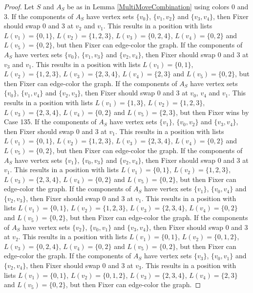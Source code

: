 \documentclass[12pt]{amsart}
\theoremstyle{plain}
\theoremstyle{definition}
\theoremstyle{remark}
\begin{document}
\begin{proof}
Let $S$ and $A_S$ be as in Lemma \ref{MultiMoveCombination} using colors $0$ and $3$. If the components of $A_S$ have vertex sets $\{v_0\}$, $\{v_1, v_2\}$ and $\{v_3, v_4\}$, then Fixer should swap 0 and 3 at $v_2$ and $v_1$. This results in a position with lists $L(v_1) = \{0, 1\}$, $L(v_2) = \{1, 2, 3\}$, $L(v_3) = \{0, 2, 4\}$, $L(v_4) = \{0, 2\}$ and $L(v_5) = \{0, 2\}$, but then Fixer can edge-color the graph.
If the components of $A_S$ have vertex sets $\{v_0\}$, $\{v_1, v_3\}$ and $\{v_2, v_4\}$, then Fixer should swap 0 and 3 at $v_3$ and $v_1$. This results in a position with lists $L(v_1) = \{0, 1\}$, $L(v_2) = \{1, 2, 3\}$, $L(v_3) = \{2, 3, 4\}$, $L(v_4) = \{2, 3\}$ and $L(v_5) = \{0, 2\}$, but then Fixer can edge-color the graph.
If the components of $A_S$ have vertex sets $\{v_0\}$, $\{v_1, v_4\}$ and $\{v_2, v_3\}$, then Fixer should swap 0 and 3 at $v_0$, $v_4$ and $v_1$. This results in a position with lists $L(v_1) = \{1, 3\}$, $L(v_2) = \{1, 2, 3\}$, $L(v_3) = \{2, 3, 4\}$, $L(v_4) = \{0, 2\}$ and $L(v_5) = \{2, 3\}$, but then Fixer wins by Case 135.
If the components of $A_S$ have vertex sets $\{v_1\}$, $\{v_0, v_2\}$ and $\{v_3, v_4\}$, then Fixer should swap 0 and 3 at $v_1$. This results in a position with lists $L(v_1) = \{0, 1\}$, $L(v_2) = \{1, 2, 3\}$, $L(v_3) = \{2, 3, 4\}$, $L(v_4) = \{0, 2\}$ and $L(v_5) = \{0, 2\}$, but then Fixer can edge-color the graph.
If the components of $A_S$ have vertex sets $\{v_1\}$, $\{v_0, v_3\}$ and $\{v_2, v_4\}$, then Fixer should swap 0 and 3 at $v_1$. This results in a position with lists $L(v_1) = \{0, 1\}$, $L(v_2) = \{1, 2, 3\}$, $L(v_3) = \{2, 3, 4\}$, $L(v_4) = \{0, 2\}$ and $L(v_5) = \{0, 2\}$, but then Fixer can edge-color the graph.
If the components of $A_S$ have vertex sets $\{v_1\}$, $\{v_0, v_4\}$ and $\{v_2, v_3\}$, then Fixer should swap 0 and 3 at $v_1$. This results in a position with lists $L(v_1) = \{0, 1\}$, $L(v_2) = \{1, 2, 3\}$, $L(v_3) = \{2, 3, 4\}$, $L(v_4) = \{0, 2\}$ and $L(v_5) = \{0, 2\}$, but then Fixer can edge-color the graph.
If the components of $A_S$ have vertex sets $\{v_2\}$, $\{v_0, v_1\}$ and $\{v_3, v_4\}$, then Fixer should swap 0 and 3 at $v_2$. This results in a position with lists $L(v_1) = \{0, 1\}$, $L(v_2) = \{0, 1, 2\}$, $L(v_3) = \{0, 2, 4\}$, $L(v_4) = \{0, 2\}$ and $L(v_5) = \{0, 2\}$, but then Fixer can edge-color the graph.
If the components of $A_S$ have vertex sets $\{v_3\}$, $\{v_0, v_1\}$ and $\{v_2, v_4\}$, then Fixer should swap 0 and 3 at $v_3$. This results in a position with lists $L(v_1) = \{0, 1\}$, $L(v_2) = \{0, 1, 2\}$, $L(v_3) = \{2, 3, 4\}$, $L(v_4) = \{2, 3\}$ and $L(v_5) = \{0, 2\}$, but then Fixer can edge-color the graph.

\end{proof}
\end{document}
